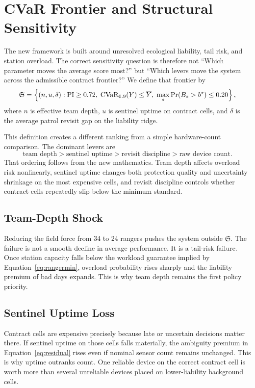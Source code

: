 \section{CVaR Frontier and Structural Sensitivity}
The new framework is built around unresolved ecological liability, tail risk, and station overload. The correct sensitivity question is therefore not ``Which parameter moves the average score most?'' but ``Which levers move the system across the admissible contract frontier?'' We define that frontier by
\[
\mathfrak{S}
=
\left\{
(n,u,\delta):
\mathrm{PI}\ge 0.72,\;
\operatorname{CVaR}_{0.9}(Y)\le \overline Y,\;
\max_s \Pr(B_s>b^\star)\le 0.20
\right\},
\]
where \(n\) is effective team depth, \(u\) is sentinel uptime on contract cells, and \(\delta\) is the average patrol revisit gap on the liability ridge.

This definition creates a different ranking from a simple hardware-count comparison. The dominant levers are
\[
\text{team depth}
>
\text{sentinel uptime}
>
\text{revisit discipline}
>
\text{raw device count}.
\]
That ordering follows from the new mathematics. Team depth affects overload risk nonlinearly, sentinel uptime changes both protection quality and uncertainty shrinkage on the most expensive cells, and revisit discipline controls whether contract cells repeatedly slip below the minimum standard.

\subsection{Team-Depth Shock}
Reducing the field force from 34 to 24 rangers pushes the system outside \(\mathfrak{S}\). The failure is not a smooth decline in average performance. It is a tail-risk failure. Once station capacity falls below the workload guarantee implied by Equation~\eqref{eq:rangermin}, overload probability rises sharply and the liability premium of bad days expands. This is why team depth remains the first policy priority.

\subsection{Sentinel Uptime Loss}
Contract cells are expensive precisely because late or uncertain decisions matter there. If sentinel uptime on those cells falls materially, the ambiguity premium in Equation~\eqref{eq:residual} rises even if nominal sensor count remains unchanged. This is why uptime outranks count. One reliable device on the correct contract cell is worth more than several unreliable devices placed on lower-liability background cells.

